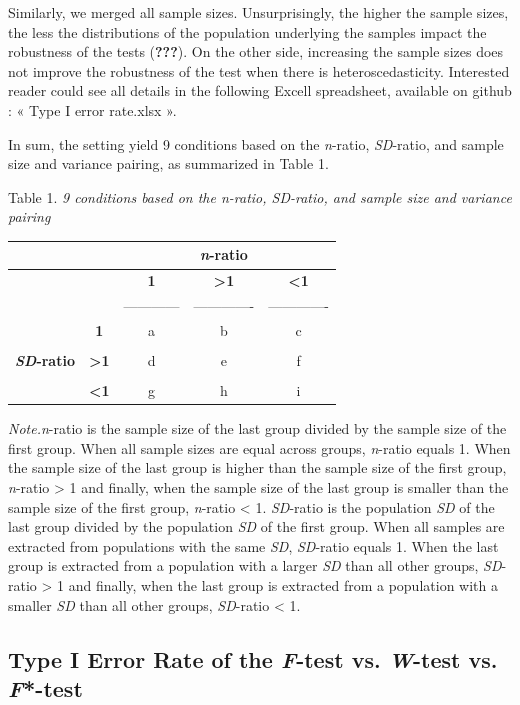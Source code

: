 \documentclass[man,floatsintext]{apa6}
\begin{document}
Similarly, we merged all sample sizes. Unsurprisingly, the higher the
sample sizes, the less the distributions of the population underlying
the samples impact the robustness of the tests ({\textbf{???}}). On the
other side, increasing the sample sizes does not improve the robustness
of the test when there is heteroscedasticity. Interested reader could
see all details in the following Excell spreadsheet, available on github
: « Type I error rate.xlsx ».

In sum, the setting yield 9 conditions based on the \emph{n}-ratio,
\emph{SD}-ratio, and sample size and variance pairing, as summarized in
Table 1.

Table 1. \emph{9 conditions based on the n-ratio, SD-ratio, and sample
size and variance pairing}

\begin{longtable}[]{@{}ccccc@{}}
\toprule
& & & \textbf{\emph{n}-ratio} &\tabularnewline
\midrule
\endhead
& & \textbf{1} & \textbf{\textgreater{}1} &
\textbf{\textless{}1}\tabularnewline
& & ------------ & ------------- & -------------\tabularnewline
& \textbf{1} & a & b & c\tabularnewline
& & & &\tabularnewline
\textbf{\emph{SD}-ratio} & \textbf{\textgreater{}1} & d & e &
f\tabularnewline
& & & &\tabularnewline
& \textbf{\textless{}1} & g & h & i\tabularnewline
\bottomrule
\end{longtable}

\emph{Note.n}-ratio is the sample size of the last group divided by the
sample size of the first group. When all sample sizes are equal across
groups, \emph{n}-ratio equals 1. When the sample size of the last group
is higher than the sample size of the first group, \emph{n}-ratio
\textgreater{} 1 and finally, when the sample size of the last group is
smaller than the sample size of the first group, \emph{n}-ratio
\textless{} 1. \emph{SD}-ratio is the population \emph{SD} of the last
group divided by the population \emph{SD} of the first group. When all
samples are extracted from populations with the same \emph{SD},
\emph{SD}-ratio equals 1. When the last group is extracted from a
population with a larger \emph{SD} than all other groups,
\emph{SD}-ratio \textgreater{} 1 and finally, when the last group is
extracted from a population with a smaller \emph{SD} than all other
groups, \emph{SD}-ratio \textless{} 1.

\subsection{\texorpdfstring{Type I Error Rate of the \emph{F}-test vs.
\emph{W}-test vs.
\emph{F}*-test}{Type I Error Rate of the F-test vs. W-test vs. F*-test}}\label{type-i-error-rate-of-the-f-test-vs.-w-test-vs.-f-test}
\end{document}
